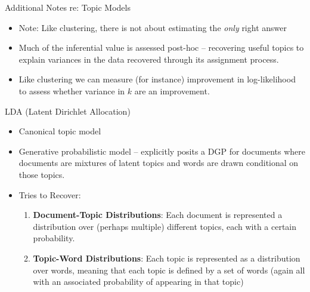 \documentclass[
  ignorenonframetext,
  aspectratio=169]{beamer}
\begin{document}
\begin{frame}{Additional Notes re: Topic Models}
\label{additional-notes-re-topic-models}
\begin{itemize}
\item Note: Like clustering, there is not about estimating the \textit{only} right answer \par \vspace{2.5mm} \pause
\item Much of the inferential value is assessed post-hoc -- recovering useful topics to explain variances in the data recovered through its assignment process. \par \vspace{2.5mm} \pause
\item Like clustering we can measure (for instance) improvement in log-likelihood to assess whether variance in $k$ are an improvement. 
\end{itemize}
\end{frame}

\begin{frame}{LDA (Latent Dirichlet Allocation)}
\label{lda-latent-dirichlet-allocation}
\begin{itemize}
\item Canonical topic model \par \vspace{2.5mm}
\item Generative probabilistic model – explicitly posits a DGP for documents where documents are mixtures of latent topics and words are drawn conditional on those topics. \par \vspace{2.5mm}
\item Tries to Recover: 
  \begin{enumerate}
  \item \textbf{Document-Topic Distributions}: Each document is represented a distribution over (perhaps multiple) different topics, each with a certain probability.
  \item \textbf{Topic-Word Distributions}: Each topic is represented as a distribution over words, meaning that each topic is defined by a set of words (again all with an associated probability of appearing in that topic)
  \end{enumerate} 
\end{itemize}
\end{frame}
\end{document}
